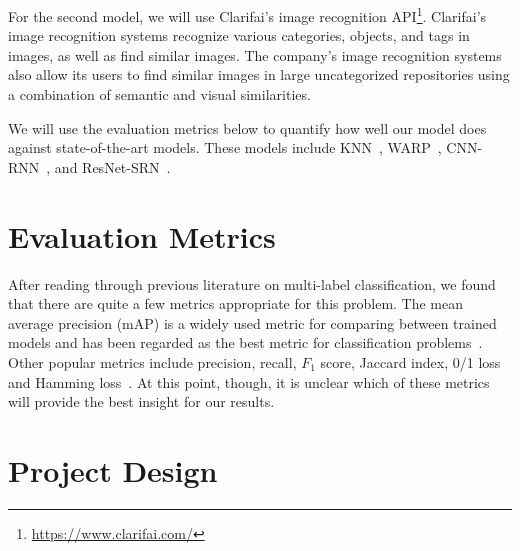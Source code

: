 \documentclass[10pt, a4paper, twocolumn]{article} %
\begin{document}
For the second model, we will use Clarifai's image recognition API\footnote{\url{https://www.clarifai.com/}}.  Clarifai’s image recognition systems recognize various categories, objects, and tags in images, as well as find similar images. The company’s image recognition systems also allow its users to find similar images in large uncategorized repositories using a combination of semantic and visual similarities.  

We will use the evaluation metrics below to quantify how well our model does against state-of-the-art models. These models include KNN~\cite{nus-wide-civr09}, WARP~\cite{GongJLTI13}, CNN-RNN~\cite{WangYMHHX16}, and ResNet-SRN~\cite{ZhuLOYW17}.

\section{Evaluation Metrics\label{sec:6}} %


After reading through previous literature on multi-label classification, we found that there are quite a few metrics appropriate for this problem. The mean average precision (mAP) is a widely used metric for comparing between trained models and has been regarded as the best metric for classification problems~\cite{Lavrenko_2014}.  Other popular metrics include precision, recall, $F_1$ score, Jaccard index, 0/1 loss and Hamming loss~\cite{Tsoumakas:2007,SOKOLOVA2009427,Herrera:2016}. At this point, though, it is unclear which of these metrics will provide the best insight for our results.


\section{Project Design\label{sec:7}} %
\end{document}
